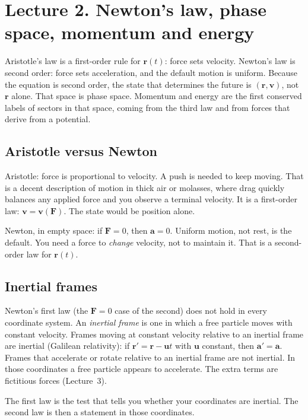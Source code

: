 \documentclass[11pt]{article}
\numberwithin{equation}{section}
\newcommand{\vect}[1]{\mathbf{#1}}
\begin{document}
\section{Lecture 2. Newton's law, phase space, momentum and energy}

Aristotle's law is a first-order rule for $\vect{r}(t)$: force sets velocity. Newton's law is second order: force sets acceleration, and the default motion is uniform. Because the equation is second order, the state that determines the future is $(\vect{r},\vect{v})$, not $\vect{r}$ alone. That space is phase space. Momentum and energy are the first conserved labels of sectors in that space, coming from the third law and from forces that derive from a potential.

\subsection{Aristotle versus Newton}

Aristotle: force is proportional to velocity. A push is needed to keep moving. That is a decent description of motion in thick air or molasses, where drag quickly balances any applied force and you observe a terminal velocity. It is a first-order law: $\vect{v}=\vect{v}(\vect{F})$. The state would be position alone.

Newton, in empty space: if $\vect{F}=0$, then $\vect{a}=0$. Uniform motion, not rest, is the default. You need a force to \emph{change} velocity, not to maintain it. That is a second-order law for $\vect{r}(t)$.

\subsection{Inertial frames}

Newton's first law (the $\vect{F}=0$ case of the second) does not hold in every coordinate system. An \emph{inertial frame} is one in which a free particle moves with constant velocity. Frames moving at constant velocity relative to an inertial frame are inertial (Galilean relativity): if $\vect{r}'=\vect{r}-\vect{u}t$ with $\vect{u}$ constant, then $\vect{a}'=\vect{a}$. Frames that accelerate or rotate relative to an inertial frame are not inertial. In those coordinates a free particle appears to accelerate. The extra terms are fictitious forces (Lecture~3).

The first law is the test that tells you whether your coordinates are inertial. The second law is then a statement in those coordinates.
\end{document}
